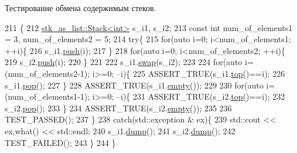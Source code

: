 Тестирование обмена содержимым стеков. 


\begin{DoxyCode}
211                         \{
212         \hyperlink{classstk__as__list_1_1_stack}{stk\_as\_list::Stack<int>} s\_i1, s\_i2;
213         \textcolor{keyword}{const} \textcolor{keywordtype}{int} num\_of\_elements1 = 3, num\_of\_elements2 = 5;
214         \textcolor{keywordflow}{try}\{
215             \textcolor{keywordflow}{for}(\textcolor{keyword}{auto} i=0; i<num\_of\_elements1; ++i)\{
216                 s\_i1.\hyperlink{classstk__as__list_1_1_stack_ad31b678390ac3f2076e9b757c95600be}{push}(i);
217             \}
218             \textcolor{keywordflow}{for}(\textcolor{keyword}{auto} i=0; i<num\_of\_elements2; ++i)\{
219                 s\_i2.\hyperlink{classstk__as__list_1_1_stack_ad31b678390ac3f2076e9b757c95600be}{push}(i);
220             \}
221 
222             s\_i1.\hyperlink{classstk__as__list_1_1_stack_a873d054824f9029f80df0fe8101eeda3}{swap}(s\_i2);
223 
224             \textcolor{keywordflow}{for}(\textcolor{keyword}{auto} i=(num\_of\_elements2-1); i>=0; --i)\{
225                 ASSERT\_TRUE(s\_i1.\hyperlink{classstk__as__list_1_1_stack_a20e64b09239efa6340b33546115424b6}{top}()==i);
226                 s\_i1.\hyperlink{classstk__as__list_1_1_stack_a09e820f3c3531cf3f401af3b3ca5d56f}{pop}();
227             \}
228             ASSERT\_TRUE(s\_i1.\hyperlink{classstk__as__list_1_1_stack_a2bd88c7b8faf901f4830ed616bf6478f}{empty}());
229 
230             \textcolor{keywordflow}{for}(\textcolor{keyword}{auto} i=(num\_of\_elements1-1); i>=0; --i)\{
231                 ASSERT\_TRUE(s\_i2.\hyperlink{classstk__as__list_1_1_stack_a20e64b09239efa6340b33546115424b6}{top}()==i);
232                 s\_i2.\hyperlink{classstk__as__list_1_1_stack_a09e820f3c3531cf3f401af3b3ca5d56f}{pop}();
233             \}
234             ASSERT\_TRUE(s\_i2.\hyperlink{classstk__as__list_1_1_stack_a2bd88c7b8faf901f4830ed616bf6478f}{empty}());
235 
236             TEST\_PASSED();
237         \}
238         \textcolor{keywordflow}{catch}(std::exception & ex)\{
239             std::cout << ex.what() << std::endl;
240             s\_i1.\hyperlink{classstk__as__list_1_1_stack_aa556423ef52feaa947b2683440f2860c}{dump}();
241             s\_i2.\hyperlink{classstk__as__list_1_1_stack_aa556423ef52feaa947b2683440f2860c}{dump}();
242             TEST\_FAILED();
243         \}
244     \}
\end{DoxyCode}
\hypertarget{namespacestk__test_a263e5f6322755d69d17e5cd0f139a0da}{}
